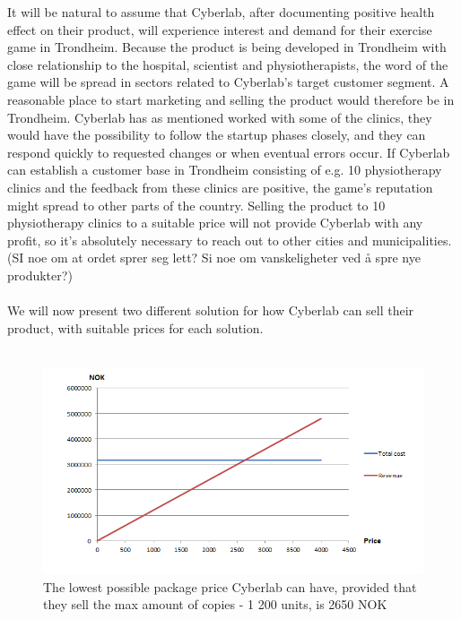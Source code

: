 It will be natural to assume that Cyberlab, after documenting positive health effect on their product, will experience interest and demand for their exercise game in Trondheim. Because the product is being developed in Trondheim with close relationship to the hospital, scientist and physiotherapists, the word of the game will be spread in sectors related to Cyberlab's target customer segment. A reasonable place to start marketing and selling the product would therefore be in Trondheim. Cyberlab has as mentioned worked with some of the clinics, they would have the possibility to follow the startup phases closely, and they can respond quickly to requested changes or when eventual errors occur. If Cyberlab can establish a customer base in Trondheim consisting of e.g. 10 physiotherapy clinics and the feedback from these clinics are positive, the game’s reputation might spread to other parts of the country. Selling the product to 10 physiotherapy clinics to a suitable price will not provide Cyberlab with any profit, so it’s absolutely necessary to reach out to other cities and municipalities. (SI noe om at ordet sprer seg lett? Si noe om vanskeligheter ved {å} spre nye produkter?)\\ \\
We will now present two different solution for how Cyberlab can sell their product, with suitable prices for each solution.\\ \\
\begin{figure}
\label{fig:RevenueStreamPrice}
\begin{center}
\includegraphics[scale=0.8]{revenuestreamprice}
\caption[Price example]{The lowest possible package price Cyberlab can have, provided that they sell the max amount of  copies - 1 200 units, is 2650 NOK}
\end{center}
\end{figure}
